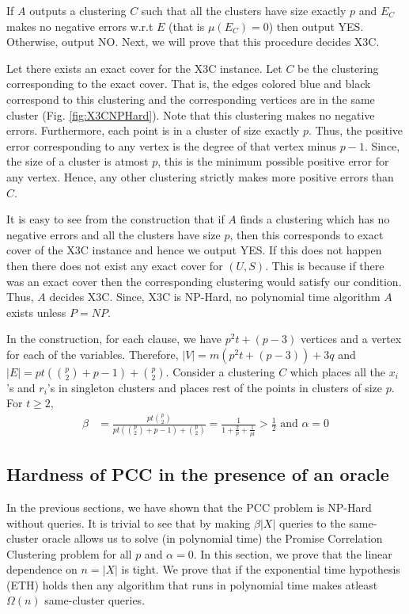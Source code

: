 \documentclass[12pt]{article}
\begin{document}
If $A$ outputs a clustering $C$ such that all the clusters have size exactly $p$ and $E_C$ makes no negative errors w.r.t $E$ (that is $\mu(E_C) = 0$) then output YES. Otherwise, output NO. Next, we will prove that this procedure decides X3C. 

Let there exists an exact cover for the X3C instance. Let $C$ be the clustering corresponding to the exact cover. That is, the edges colored blue and black correspond to this clustering and the corresponding vertices are in the same cluster (Fig. \ref{fig:X3CNPHard}). Note that this clustering makes no negative errors. Furthermore, each point is in a cluster of size exactly $p$. Thus, the positive error corresponding to any vertex is the degree of that vertex minus $p-1$. Since, the size of a cluster is atmost $p$, this is the minimum possible positive error for any vertex. Hence, any other clustering strictly makes more positive errors than $C$. 

It is easy to see from the construction that if $A$ finds a clustering which has no negative errors and all the clusters have size $p$, then this corresponds to exact cover of the X3C instance and hence we output YES. If this does not happen then there does not exist any exact cover for $(U, S)$. This is because if there was an exact cover then the corresponding clustering would satisfy our condition. Thus, $A$ decides X3C. Since, X3C is NP-Hard, no polynomial time algorithm $A$ exists unless $P = NP$.

In the construction, for each clause, we have $p^2 t + (p - 3)$ vertices and a vertex for each of the variables. Therefore, $|V| = m (p^2 t + (p-3)) + 3q$ and $|E| = pt({p \choose 2}+p-1) + {p \choose 2}$.  Consider a clustering $C$ which places all the $x_i$'s  and $r_i$'s in singleton clusters and places rest of the points in clusters of size $p$. For $t \ge 2$,
\begin{align*}
  \beta &= \frac{pt{p \choose 2}}{pt({p \choose 2}+p-1) + {p \choose 2}} = \frac{1}{1 + \frac{2}{p} + \frac{1}{pt}} > \frac{1}{2} \text{ and }\alpha = 0
\end{align*} 

\subsection{Hardness of PCC in the presence of an oracle}
\label{section:PCCNPHardOracle}
In the previous sections, we have shown that the PCC problem is NP-Hard without queries. It is trivial to see that by making $\beta |X|$ queries to the same-cluster oracle allows us to solve (in polynomial time) the Promise Correlation Clustering problem for all $p$ and $\alpha = 0$. In this section, we prove that the linear dependence on $n = |X|$ is tight. We prove that if the exponential time hypothesis (ETH) holds then any algorithm that runs in polynomial time makes atleast $\Omega(n)$ same-cluster queries.
\end{document}
